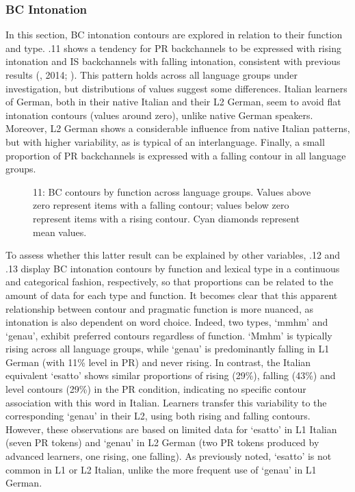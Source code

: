 \subsubsection{  BC Intonation}
\hypertarget{Toc191305957}{}
In this section, BC intonation contours are explored in relation to their function and type. .11 shows a tendency for PR backchannels to be expressed with rising intonation and IS backchannels with falling intonation, consistent with previous results (\citealt{Savino2010,Savino2011}, 2014; \citealt{Wehrle2022}). This pattern holds across all language groups under investigation, but distributions of values suggest some differences. Italian learners of German, both in their native Italian and their L2 German, seem to avoid flat intonation contours (values around zero), unlike native German speakers. Moreover, L2 German shows a considerable influence from native Italian patterns, but with higher variability, as is typical of an interlanguage. Finally, a small proportion of PR backchannels is expressed with a falling contour in all language groups.

  
 

\begin{stylecaption}\begin{figure}
\caption{11: BC contours by function across language groups. Values above zero represent items with a falling contour; values below zero represent items with a rising contour. Cyan diamonds represent mean values.}
\label{fig:key:4}
\end{figure}\end{stylecaption}

To assess whether this latter result can be explained by other variables, .12 and .13 display BC intonation contours by function and lexical type in a continuous and categorical fashion, respectively, so that proportions can be related to the amount of data for each type and function. It becomes clear that this apparent relationship between contour and pragmatic function is more nuanced, as intonation is also dependent on word choice. Indeed, two types, ‘mmhm’ and ‘genau’, exhibit preferred contours regardless of function. ‘Mmhm’ is typically rising across all language groups, while ‘genau’ is predominantly falling in L1 German (with 11\% level in PR) and never rising. In contrast, the Italian equivalent ‘esatto’ shows similar proportions of rising (29\%), falling (43\%) and level contours (29\%) in the PR condition, indicating no specific contour association with this word in Italian. Learners transfer this variability to the corresponding ‘genau’ in their L2, using both rising and falling contours. However, these observations are based on limited data for ‘esatto’ in L1 Italian (seven PR tokens) and ‘genau’ in L2 German (two PR tokens produced by advanced learners, one rising, one falling). As previously noted, ‘esatto’ is not common in L1 or L2 Italian, unlike the more frequent use of ‘genau’ in L1 German.

